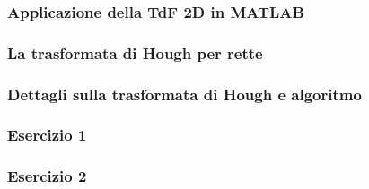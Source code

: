 \documentclass[a4paper]{article}
\begin{document}
	\subsubsection{Applicazione della TdF 2D in MATLAB}
	
	\subsubsection{La trasformata di Hough per rette}
	
	\subsubsection{Dettagli sulla trasformata di Hough e algoritmo}
	
	\subsubsection{Esercizio 1}
	
	\subsubsection{Esercizio 2}
\end{document}
